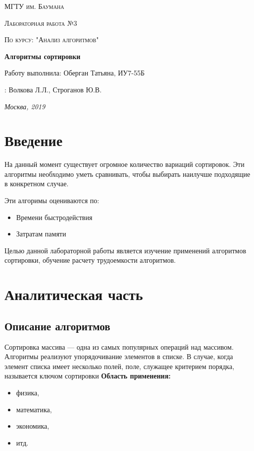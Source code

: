 \documentclass[12pt]{report}
\begin{document}
\begin{titlepage}
	\centering
	{\scshape\LARGE МГТУ им. Баумана \par}
	\vspace{3cm}
	{\scshape\Large Лабораторная работа №3\par}
	\vspace{0.5cm}	
	{\scshape\Large По курсу: "Анализ алгоритмов"\par}
	\vspace{1.5cm}
	{\huge\bfseries Алгоритмы сортировки\par}
	\vspace{2cm}
	\Large Работу выполнила: Оберган Татьяна, ИУ7-55Б\par
	\vspace{0.5cm}
	:  Волкова Л.Л., Строганов Ю.В.\par

	\vfill
	\large \textit {Москва, 2019} \par
\end{titlepage}

\tableofcontents

\newpage
\chapter*{Введение}

На данный момент существует огромное количество вариаций сортировок.
Эти алгоритмы необходимо уметь сравнивать, чтобы выбирать наилучше подходящие в конкретном случае. 

Эти алгоримы оцениваются по:

\begin{itemize}
	\item Времени быстродействия
	\item Затратам памяти
\end{itemize}

Целью данной лабораторной работы является изучение применений алгоритмов сортировки, обучение расчету трудоемкости алгоритмов.


\chapter{Аналитическая часть}
\section{Описание алгоритмов}
Сортировка массива — одна из самых популярных операций над массивом. Алгоритмы реализуют упорядочивание элементов в списке.
 В случае, когда элемент списка имеет несколько полей, поле, служащее критерием порядка, называется ключом сортировки
\textbf{Область применения:} 
\begin{itemize}
  	\item физика,
	\item математика,
	\item экономика,
	\item итд.
\end{itemize}
\end{document}
